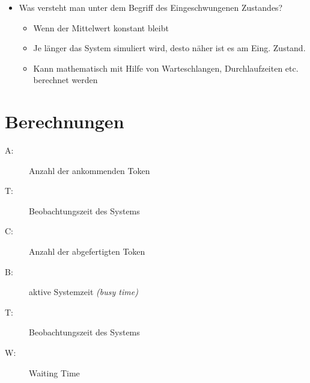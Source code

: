 \begin{itemize}
\begin{itemize}
    \end{itemize} 
    \item Was versteht man unter dem Begriff des Eingeschwungenen Zustandes?
    \begin{itemize}
        \item Wenn der Mittelwert konstant bleibt
        \item Je länger das System simuliert wird, desto näher ist es am Eing. Zustand.
        \item Kann mathematisch mit Hilfe von Warteschlangen, Durchlaufzeiten etc. berechnet werden
    \end{itemize} 

\end{itemize}

\section{Berechnungen}



\begin{minipage}{0.45\textwidth}
    \begin{description}
    \item[A:] Anzahl der ankommenden Token
    \item[T:] Beobachtungszeit des Systems
    \item[C:] Anzahl der abgefertigten Token
    \end{description}
\end{minipage}
\begin{minipage}{0.45\textwidth}
    \begin{description}
    \item[B:] aktive Systemzeit \textit{(busy time)}
    \item[T:] Beobachtungszeit des Systems
    \item[W:] Waiting Time
    \end{description} 
\end{minipage}
\newline
\newline
\newline


